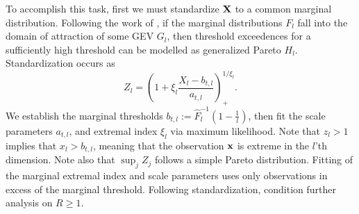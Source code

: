 To accomplish this task, first we must standardize ${\bf X}$ to a common marginal distribution.
  Following the work of \cite{ferreira2014}, if the marginal distributions $F_{l}$ fall into the domain
  of attraction of some GEV $G_l$, then threshold exceedences for a sufficiently high threshold can
  be modelled as generalized Pareto $H_l$.  Standardization occurs as
  \begin{equation}
    Z_l = \left(1 + \xi_l\frac{X_l - b_{t,l}}{a_{t,l}}\right)_{+}^{1/\xi_l}.
  \end{equation}
  We establish the marginal thresholds $b_{t,l} := \hat{F}_l^{-1}\left(1 - \frac{1}{l}\right)$,
  then fit the scale parameters $a_{t,l}$, and extremal index $\xi_l$ via maximum likelihood.
  Note that $z_l > 1$ implies that $x_l > b_{t,l}$, meaning that the observation ${\bf x}$ is
  extreme in the $l$'th dimension.  Note also that $\sup_j Z_j$ follows a simple Pareto distribution.
  Fitting of the marginal extremal index and scale parameters uses only observations in excess of the
  marginal threshold. Following standardization, condition further analysis on $R \geq 1$.


